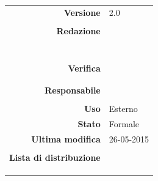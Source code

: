 \begin{titlepage}
\begin{center}
	\begin{table}[h]
	\begin{center}
	\begin{tabular}{r | l}
		\textbf{Versione} & 2.0 \\ \\
		\textbf{Redazione} & \VeFe \\ 
			& \CoMa \\ 
			& \CaMa \\
			& \MaMo \\
			& \ReAn \\
			& \GoIs \\
			& \DeEn \\ \\
		\textbf{Verifica} & \MaMo \\
			& \ReAn \\ \\
		\textbf{Responsabile} & \GoIs \\ \\
		\textbf{Uso} & Esterno \\
		\textbf{Stato} & Formale \\
		\textbf{Ultima modifica} & 26-05-2015 \\ \\
		\textbf{Lista di distribuzione} & \gruppo \\ 
			& \Vardanega \\
			& \Cardin \\
			& \Zucchetti \\
	\end{tabular}
	\end{center}
	\end{table}
	\end{center}
\end{titlepage}